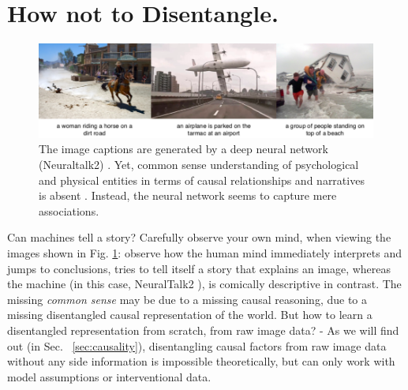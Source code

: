 \section{How not to Disentangle.}
	\begin{figure}[htp]
		\centering
		\includegraphics[trim={0cm 0cm 0cm 0cm},clip, width=1.\linewidth]{fig/other/notcausal}
		\caption{The image captions are generated by a deep neural network (Neuraltalk2) \cite{karpathy15neuraltalk}. Yet, common sense understanding of psychological and physical entities in terms of causal relationships and narratives is absent \cite{tenenbaum18think}. Instead, the neural network seems to capture mere associations.}
		\label{fig:notcausal}
	\end{figure}
	Can machines tell a story? Carefully observe your own mind, when viewing the images shown in Fig. \ref{fig:notcausal}: observe how the human mind immediately interprets and jumps to conclusions, tries to tell itself a story that explains an image, whereas the machine (in this case, NeuralTalk2 \cite{karpathy15neuraltalk}), is comically descriptive in contrast.
	The missing \textit{common sense} may be due to a missing causal reasoning, due to a missing disentangled causal representation of the world.
	But how to learn a disentangled representation from scratch, \ie from raw image data? -
	As we will find out (in Sec. ~\ref{sec:causality}), disentangling causal factors from raw image data without any side information is impossible theoretically, but can only work with model assumptions or interventional data.

